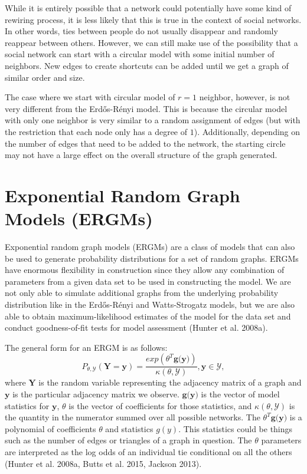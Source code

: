 \documentclass[12pt,twoside]{amherstthesis}
\begin{document}
  While it is entirely possible that a network could potentially have some
  kind of rewiring process, it is less likely that this is true in the
  context of social networks. In other words, ties between people do not
  usually disappear and randomly reappear between others. However, we can
  still make use of the possibility that a social network can start with a
  circular model with some initial number of neighbors. New edges to
  create shortcuts can be added until we get a graph of similar order and
  size.
  
  The case where we start with circular model of \(r = 1\) neighbor,
  however, is not very different from the Erdős-Rényi model. This is
  because the circular model with only one neighbor is very similar to a
  random assignment of edges (but with the restriction that each node only
  has a degree of \(1\)). Additionally, depending on the number of edges
  that need to be added to the network, the starting circle may not have a
  large effect on the overall structure of the graph generated.
  
  \section{Exponential Random Graph Models
  (ERGMs)}\label{exponential-random-graph-models-ergms}
  
  Exponential random graph models (ERGMs) are a class of models that can
  also be used to generate probability distributions for a set of random
  graphs. ERGMs have enormous flexibility in construction since they allow
  any combination of parameters from a given data set to be used in
  constructing the model. We are not only able to simulate additional
  graphs from the underlying probability distribution like in the
  Erdős-Rényi and Watts-Strogatz models, but we are also able to obtain
  maximum-likelihood estimates of the model for the data set and conduct
  goodness-of-fit tests for model assessment (Hunter et al. 2008a).
  
  The general form for an ERGM is as follows:
  \[P_{\theta, \mathcal{Y}}(\textbf{Y} = \textbf{y}) = \frac {exp(\theta^{T}\textbf{g(y)})} {\kappa(\theta, \mathcal{Y})},\textbf{y} \in \mathcal{Y}, \]
  where \(\textbf{Y}\) is the random variable representing the adjacency
  matrix of a graph and \(\textbf{y}\) is the particular adjacency matrix
  we observe. \(\textbf{g(y)}\) is the vector of model statistics for
  \(\textbf{y}\), \(\theta\) is the vector of coefficients for those
  statistics, and \(\kappa(\theta, \mathcal{Y})\) is the quantity in the
  numerator summed over all possible networks. The
  \(\theta^{T}\textbf{g(y)}\) is a polynomial of coefficients \(\theta\)
  and statistics \(g(y)\). This statistics could be things such as the
  number of edges or triangles of a graph in question. The \(\theta\)
  parameters are interpreted as the log odds of an individual tie
  conditional on all the others (Hunter et al. 2008a, Butts et al. 2015,
  Jackson 2013).
  
\end{document}
